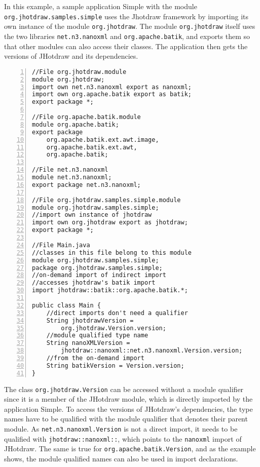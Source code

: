 In this example, a sample application Simple with the module \texttt{org.jhotdraw.samples.simple}
uses the Jhotdraw framework by importing its own instance of the module
\texttt{org.jhotdraw}. The module \texttt{org.jhotdraw} itself uses the 
two libraries \texttt{net.n3.nanoxml} and \texttt{org.apache.batik}, and
exports them so that other modules can also access their classes. The 
application then gets the versions of JHotdraw and its dependencies.

\begin{lstlisting}[caption=Module Qualified Type References,numbers=left]
//File org.jhotdraw.module
module org.jhotdraw;
import own net.n3.nanoxml export as nanoxml;
import own org.apache.batik export as batik;
export package *;

//File org.apache.batik.module
module org.apache.batik;
export package 
	org.apache.batik.ext.awt.image,
	org.apache.batik.ext.awt,
	org.apache.batik;

//File net.n3.nanoxml
module net.n3.nanoxml;
export package net.n3.nanoxml;

//File org.jhotdraw.samples.simple.module
module org.jhotdraw.samples.simple;
//import own instance of jhotdraw
import own org.jhotdraw export as jhotdraw;
export package *;

//File Main.java
//classes in this file belong to this module
module org.jhotdraw.samples.simple;
package org.jhotdraw.samples.simple;
//on-demand import of indirect import
//accesses jhotdraw's batik import
import jhotdraw::batik::org.apache.batik.*;

public class Main {
	//direct imports don't need a qualifier
	String jhotdrawVersion = 
		org.jhotdraw.Version.version;
	//module qualified type name
	String nanoXMLVersion = 
		jhotdraw::nanoxml::net.n3.nanoxml.Version.version;
	//from the on-demand import
	String batikVersion = Version.version;
}
\end{lstlisting}

The class \texttt{org.jhotdraw.Version} can be accessed without
a module qualifier since it is a member of the JHotdraw module, 
which is directly imported by the application Simple. To access
the versions of JHotdraw's dependencies, the type names have to
be qualified with the module qualifier that denotes their parent
module. As \texttt{net.n3.nanoxml.Version} is not a direct import,
it needs to be qualified with \texttt{jhotdraw::nanoxml::}, which
points to the \texttt{nanoxml} import of JHotdraw. The same is
true for \texttt{org.apache.batik.Version}, and as the example shows,
the module qualified names can also be used in import declarations.

